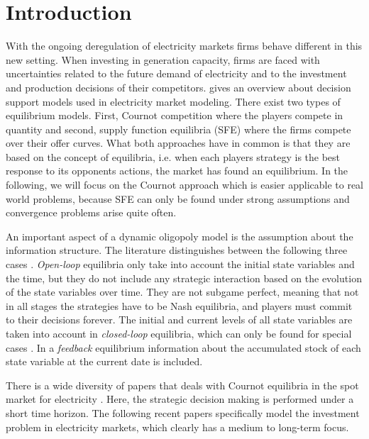 \section{Introduction}

With the ongoing deregulation of electricity markets firms behave different in this new setting. When investing in generation capacity, firms are faced with uncertainties related to the future demand of electricity and to the investment and production decisions of their competitors. \cite{Ventosa2005} gives an overview about decision support models used in electricity market modeling. There exist two types of equilibrium models. First, Cournot competition where the players compete in quantity and second, supply function equilibria (SFE) where the firms compete over their offer curves. What both approaches have in common is that they are based on the concept of \cite{Nash1951} equilibria, i.e. when each players strategy is the best response to its opponents actions, the market has found an equilibrium. In the following, we will focus on the Cournot approach which is easier applicable to real world problems, because SFE can only be found under strong assumptions and convergence problems arise quite often.

An important aspect of a dynamic oligopoly model is the assumption about the information structure. The literature distinguishes between the following three cases \citep[see, e.g.,][]{Cellini2004}. \emph{Open-loop} equilibria only take into account the initial state variables and the time, but they do not include any strategic interaction based on the evolution of the state variables over time. They are not subgame perfect, meaning that not in all stages the strategies have to be Nash equilibria, and players must commit to their decisions forever. The initial and current levels of all state variables are taken into account in \emph{closed-loop} equilibria, which can only be found for special cases \citep[see][]{Murphy2005}. In a \emph{feedback} equilibrium information about the accumulated stock of each state variable at the current date is included.

There is a wide diversity of papers that deals with Cournot equilibria in the spot market for electricity \citep[see, e.g.][]{Borenstein1999, Otero-Novas2000}. Here, the strategic decision making is performed under a short time horizon. The following recent papers specifically model the investment problem in electricity markets, which clearly has a medium to long-term focus.

